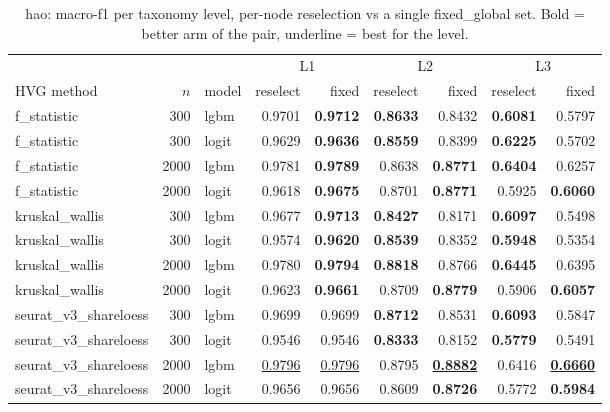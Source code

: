 \begin{table}[t]
\centering
\small
\begin{tabular}{lrlrrrrrr}
\toprule
 &  &  & \multicolumn{2}{c}{L1} & \multicolumn{2}{c}{L2} & \multicolumn{2}{c}{L3} \\
\cmidrule(lr){4-5}\cmidrule(lr){6-7}\cmidrule(lr){8-9}
HVG method & $n$ & model & reselect & fixed & reselect & fixed & reselect & fixed \\
\midrule
f\_statistic & 300 & lgbm & 0.9701 & \textbf{0.9712} & \textbf{0.8633} & 0.8432 & \textbf{0.6081} & 0.5797 \\
f\_statistic & 300 & logit & 0.9629 & \textbf{0.9636} & \textbf{0.8559} & 0.8399 & \textbf{0.6225} & 0.5702 \\
f\_statistic & 2000 & lgbm & 0.9781 & \textbf{0.9789} & 0.8638 & \textbf{0.8771} & \textbf{0.6404} & 0.6257 \\
f\_statistic & 2000 & logit & 0.9618 & \textbf{0.9675} & 0.8701 & \textbf{0.8771} & 0.5925 & \textbf{0.6060} \\
kruskal\_wallis & 300 & lgbm & 0.9677 & \textbf{0.9713} & \textbf{0.8427} & 0.8171 & \textbf{0.6097} & 0.5498 \\
kruskal\_wallis & 300 & logit & 0.9574 & \textbf{0.9620} & \textbf{0.8539} & 0.8352 & \textbf{0.5948} & 0.5354 \\
kruskal\_wallis & 2000 & lgbm & 0.9780 & \textbf{0.9794} & \textbf{0.8818} & 0.8766 & \textbf{0.6445} & 0.6395 \\
kruskal\_wallis & 2000 & logit & 0.9623 & \textbf{0.9661} & 0.8709 & \textbf{0.8779} & 0.5906 & \textbf{0.6057} \\
\midrule
seurat\_v3\_shareloess & 300 & lgbm & 0.9699 & 0.9699 & \textbf{0.8712} & 0.8531 & \textbf{0.6093} & 0.5847 \\
seurat\_v3\_shareloess & 300 & logit & 0.9546 & 0.9546 & \textbf{0.8333} & 0.8152 & \textbf{0.5779} & 0.5491 \\
seurat\_v3\_shareloess & 2000 & lgbm & \underline{0.9796} & \underline{0.9796} & 0.8795 & \underline{\textbf{0.8882}} & 0.6416 & \underline{\textbf{0.6660}} \\
seurat\_v3\_shareloess & 2000 & logit & 0.9656 & 0.9656 & 0.8609 & \textbf{0.8726} & 0.5772 & \textbf{0.5984} \\
\bottomrule
\end{tabular}
\caption{hao: macro-f1 per taxonomy level, per-node reselection vs a single fixed\_global set. Bold = better arm of the pair, underline = best for the level.}
\label{tab:comparison-hao-macrof1}
\end{table}